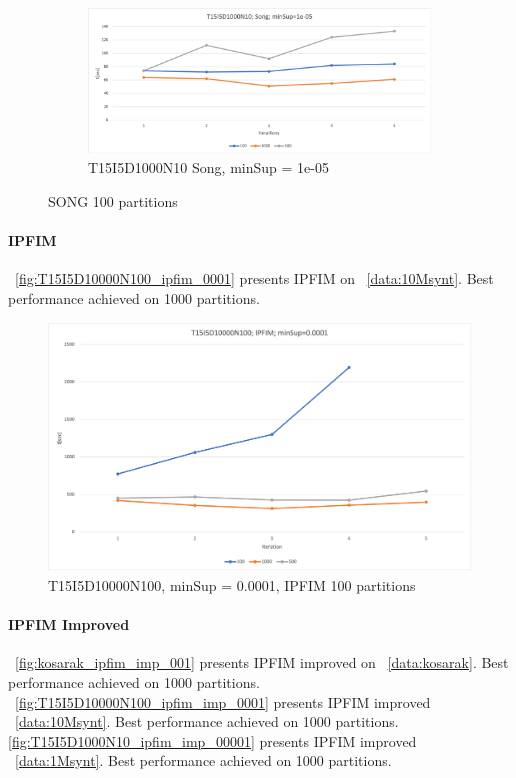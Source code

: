 \begin{figure}[H]
\begin{subfigure}{\textwidth}
  \end{subfigure}  
    \begin{subfigure}{\textwidth}
	    \centering
	  \includegraphics[width=\linewidth]{figures/4iterations/T15I5D1000N10_song_00001}
	  \caption{T15I5D1000N10 Song, minSup = 1e-05}
	  \label{fig:T15I5D1000N10_song_00001}
  \end{subfigure}  
  \caption{SONG 100 partitions}
\end{figure}

\paragraph{IPFIM}
~\autoref{fig:T15I5D10000N100_ipfim_0001} presents IPFIM on ~\autoref{data:10Msynt}.  Best performance achieved on 1000 partitions. 

\begin{figure}[H]
  \centering
  \includegraphics[width=\linewidth]{figures/4iterations/T15I5D10000N100_ipfim_0001}
  \caption{T15I5D10000N100, minSup = 0.0001,  IPFIM 100 partitions}
  \label{fig:T15I5D10000N100_ipfim_0001}
\end{figure}


\paragraph{IPFIM Improved}
~\autoref{fig:kosarak_ipfim_imp_001} presents IPFIM improved on ~\autoref{data:kosarak}.  Best performance achieved on 1000 partitions.  ~\autoref{fig:T15I5D10000N100_ipfim_imp_0001} presents IPFIM improved ~\autoref{data:10Msynt}.  Best performance achieved on 1000 partitions. \autoref{fig:T15I5D1000N10_ipfim_imp_00001} presents IPFIM improved ~\autoref{data:1Msynt}.  Best performance achieved on 1000 partitions. 

